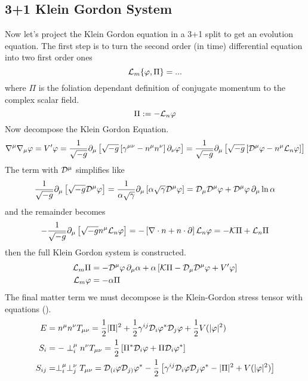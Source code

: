 \subsection{3+1 Klein Gordon System}
Now let's project the Klein Gordon equation in a 3+1 split to get an evolution equation. The first step is to turn the second order (in time) differential equation into two first order ones
\[ \mathcal{L}_m \{\varphi,\Pi \} = ...\]
where $\Pi$ is the foliation dependant definition of conjugate momentum to the complex scalar field.
\begin{equation} \Pi:= -\mathcal{L}_n \varphi\end{equation}
Now decompose the Klein Gordon Equation.
\[ \nabla^\mu \nabla_\mu \varphi = V' \varphi = \frac{1}{\sqrt{-g}} \partial_\mu \left[ \sqrt{-g}\left[\gamma^{\mu\nu}-n^\mu n^\nu\right]\partial_\nu \varphi\right] = \frac{1}{\sqrt{-g}} \partial_\mu \left[ \sqrt{-g}\left[\mathcal{D}^\mu\varphi-n^\mu \mathcal{L}_n\varphi\right]\right] \]
The term with $\mathcal{D}^\mu$ simplifies like
\[\frac{1}{\sqrt{-g}} \partial_\mu \left[ \sqrt{-g}\mathcal{D}^\mu\varphi\right] =  \frac{1}{\alpha\sqrt{\gamma}} \partial_\mu \left[\alpha\sqrt{\gamma}\mathcal{D}^\mu\varphi\right]  = \mathcal{D}_\mu \mathcal{D}^\mu \varphi + \mathcal{D}^\mu \varphi \,\partial_\mu \ln \alpha\]
and the remainder becomes
\[-\frac{1}{\sqrt{-g}} \partial_\mu \left[ \sqrt{-g}n^\mu \mathcal{L}_n\varphi\right] = -\left[\nabla \cdot n + n\cdot \partial\right]\mathcal{L}_n\varphi = -\mathcal{K}\Pi + \mathcal{L}_n \Pi\]
then the full Klein Gordon system is constructed.
\begin{align}
 \mathcal{L}_m \Pi &= - \mathcal{D}^\mu\varphi\,\partial_\mu \alpha+\alpha\left[\mathcal{K}\Pi - \mathcal{D}_\mu \mathcal{D}^\mu \varphi  + V'\varphi\right] \\
 \mathcal{L}_m \varphi &= - \alpha\Pi\end{align}
The final matter term we must decompose is the Klein-Gordon stress tensor with equations (). \begin{align} E &=n^\mu n^\nu T_{\mu\nu} = \frac{1}{2}|\Pi|^2 + \frac{1}{2}\gamma^{ij}\mathcal{D}_i \varphi^* \mathcal{D}_j \varphi +\frac{1}{2}V(|\varphi|^2)
\\ S_i &= -\perp^\mu_i n^\nu T_{\mu\nu} =  \frac{1}{2}\left[\Pi^* \mathcal{D}_i \varphi  +  \Pi\mathcal{D}_i \varphi^* \right]
\\ S_{ij} &= \perp^\mu_i \perp^\nu_j T_{\mu\nu} = \mathcal{D}_{(i}\varphi\mathcal{D}_{j)}\varphi^* - \frac{1}{2}\left[ \gamma^{ij}\mathcal{D}_i\varphi\mathcal{D}_j\varphi^* - |\Pi|^2 + V(|\varphi|^2)\right]\end{align}

